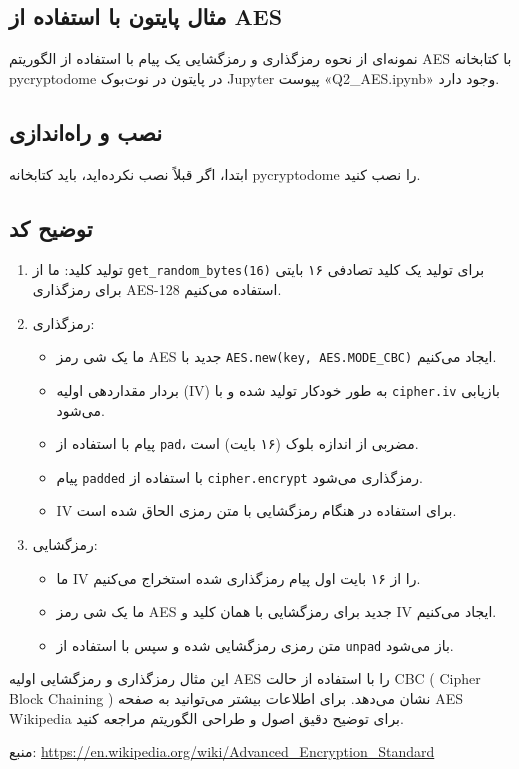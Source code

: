 \subsection*{مثال پایتون با استفاده از AES}
نمونه‌ای از نحوه رمزگذاری و رمزگشایی یک پیام با استفاده از الگوریتم AES با کتابخانه pycryptodome در پایتون در نوت‌بوک Jupyter پیوست «Q2\_AES.ipynb» وجود دارد.

\subsection*{نصب و راه‌اندازی}
ابتدا، اگر قبلاً نصب نکرده‌اید، باید کتابخانه pycryptodome را نصب کنید.

\subsection*{توضیح کد}
\begin{enumerate}
    \item تولید کلید: ما از \texttt{get\_random\_bytes(16)} برای تولید یک کلید تصادفی ۱۶ بایتی برای رمزگذاری AES-128 استفاده می‌کنیم.
    \item رمزگذاری:
        \begin{itemize}
            \item ما یک شی رمز 
            AES
            جدید با
            \texttt{AES.new(key, AES.MODE\_CBC)} 
            ایجاد می‌کنیم.
            \item بردار مقداردهی اولیه (IV) به طور خودکار تولید شده و با \texttt{cipher.iv} بازیابی می‌شود.
            \item پیام با استفاده از \texttt{pad}، مضربی از اندازه بلوک (۱۶ بایت) است.
            \item پیام \texttt{padded} با استفاده از \texttt{cipher.encrypt} رمزگذاری می‌شود.
            \item IV برای استفاده در هنگام رمزگشایی با متن رمزی الحاق شده است.
        \end{itemize}
    \item رمزگشایی:
        \begin{itemize}
            \item ما IV را از ۱۶ بایت اول پیام رمزگذاری شده استخراج می‌کنیم.
            \item ما یک شی رمز AES جدید برای رمزگشایی با همان کلید و IV ایجاد می‌کنیم.
            \item متن رمزی رمزگشایی شده و سپس با استفاده از \texttt{unpad} باز می‌شود.
        \end{itemize}
\end{enumerate}

این مثال رمزگذاری و رمزگشایی اولیه AES را با استفاده از حالت 
CBC 
(
Cipher Block Chaining
)
نشان می‌دهد. برای اطلاعات بیشتر می‌توانید به صفحه AES Wikipedia برای توضیح دقیق اصول و طراحی الگوریتم مراجعه کنید.

منبع:
\url{https://en.wikipedia.org/wiki/Advanced_Encryption_Standard}
